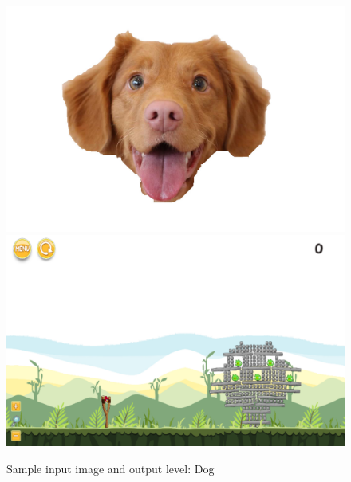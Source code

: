 \documentclass{dalthesis}
\begin{document}
\begin{figure}
	\caption{Sample input image and output level: Dog}
  \includegraphics[width=\textwidth,height=\textheight,keepaspectratio]{levels/pictures/animals/dog.jpg}
  \includegraphics[width=\textwidth,height=\textheight,keepaspectratio]{levels/screenshots/animals/dog.png}
\end{figure}
\end{document}
